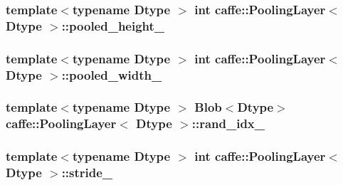 \hypertarget{classcaffe_1_1_pooling_layer_a21f1550ebe8a4b2a6731a7c871e1bda8}{
\subsubsection[{pooled\+\_\+height\+\_\+}]{\setlength{\rightskip}{0pt plus 5cm}template$<$typename Dtype $>$ int {\bf caffe\+::\+Pooling\+Layer}$<$ Dtype $>$\+::pooled\+\_\+height\+\_\+\hspace{0.3cm}{\ttfamily [protected]}}}\label{classcaffe_1_1_pooling_layer_a21f1550ebe8a4b2a6731a7c871e1bda8}
\hypertarget{classcaffe_1_1_pooling_layer_a73ddab9147f6ad736938a55a2dc74a0d}{
\subsubsection[{pooled\+\_\+width\+\_\+}]{\setlength{\rightskip}{0pt plus 5cm}template$<$typename Dtype $>$ int {\bf caffe\+::\+Pooling\+Layer}$<$ Dtype $>$\+::pooled\+\_\+width\+\_\+\hspace{0.3cm}{\ttfamily [protected]}}}\label{classcaffe_1_1_pooling_layer_a73ddab9147f6ad736938a55a2dc74a0d}
\hypertarget{classcaffe_1_1_pooling_layer_a03c023517f2f74771d6da233b161964a}{
\subsubsection[{rand\+\_\+idx\+\_\+}]{\setlength{\rightskip}{0pt plus 5cm}template$<$typename Dtype $>$ {\bf Blob}$<$Dtype$>$ {\bf caffe\+::\+Pooling\+Layer}$<$ Dtype $>$\+::rand\+\_\+idx\+\_\+\hspace{0.3cm}{\ttfamily [protected]}}}\label{classcaffe_1_1_pooling_layer_a03c023517f2f74771d6da233b161964a}
\hypertarget{classcaffe_1_1_pooling_layer_a8ae76d095f5e31218fd79ec62b99f4f3}{
\subsubsection[{stride\+\_\+}]{\setlength{\rightskip}{0pt plus 5cm}template$<$typename Dtype $>$ int {\bf caffe\+::\+Pooling\+Layer}$<$ Dtype $>$\+::stride\+\_\+\hspace{0.3cm}{\ttfamily [protected]}}}\label{classcaffe_1_1_pooling_layer_a8ae76d095f5e31218fd79ec62b99f4f3}
